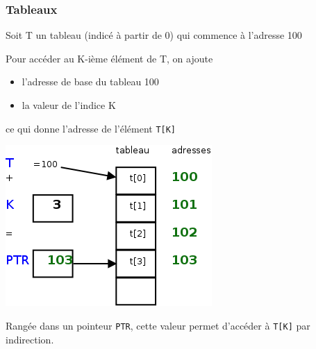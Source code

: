 \begin{frame}[containsverbatim]
  \frametitle{Tableaux}
Soit T un tableau (indicé à partir de 0) qui commence à l'adresse 100


  \begin{multicols}{2}
  Pour \alert{accéder au K-ième élément} de T, 
on ajoute 

\begin{itemize}
\item l'\alert{adresse de base} du tableau 100
\item la valeur de \alert{l'indice} K
\end{itemize}
ce qui donne l'adresse de l'élément \verb+T[K]+


\includegraphics[width=\linewidth]{figures/t100}
  \end{multicols}

Rangée dans un \alert{pointeur} \texttt{PTR}, cette valeur permet
d'accéder à \verb+T[K]+ par \alert{indirection}.
\end{frame}


